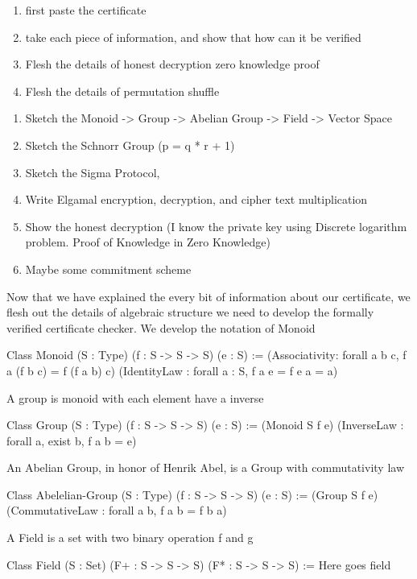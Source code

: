 \begin{enumerate}
\item first paste the certificate
\item take each piece of information, and show that how can it be verified
\item Flesh the details of honest decryption zero knowledge proof
\item Flesh the details of permutation shuffle
\end{enumerate}



\begin{enumerate}
\item Sketch the Monoid -> Group  -> Abelian Group -> Field -> Vector Space
\item Sketch the Schnorr Group (p = q * r + 1)
\item Sketch the Sigma Protocol, 
\item Write Elgamal encryption, decryption, and cipher text multiplication
\item Show the honest decryption (I know the private key using Discrete logarithm problem. 
         Proof of Knowledge in Zero Knowledge)
\item Maybe some commitment scheme
\end{enumerate}


Now that we have explained the every bit of information about our certificate, 
we flesh out the details of algebraic structure we need to develop the formally verified 
certificate checker. We develop the notation of Monoid

Class Monoid (S : Type) (f : S -> S -> S) (e : S) :=
 (Associativity: forall a b c, f a (f b c) = f (f a b) c)
 (IdentityLaw : forall a : S, f a e = f e a = a)
 
 A group is monoid with each element have  a inverse
 
 Class Group (S : Type) (f : S -> S -> S) (e : S) :=
 (Monoid S f e)
 (InverseLaw : forall a, exist b, f a b = e) 
  
 An Abelian Group, in honor of Henrik Abel,  is a Group with commutativity law
 
 Class Abelelian-Group (S : Type) (f : S -> S -> S) (e : S) :=
  (Group S f e) 
  (CommutativeLaw : forall a b, f a b = f b a)
  
  A Field is a set with two binary operation f and g
  
  Class Field (S : Set) (F+ : S -> S -> S) (F* : S -> S -> S) := 
  Here goes field
  
